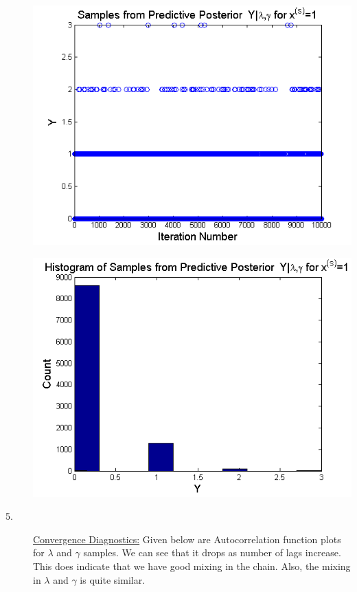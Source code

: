 \documentclass{article}
\begin{document}
\begin{description}
\noindent
\begin{left}
\includegraphics[scale=0.5]{PredPostXs1.png}
\end{left}
\begin{right}
\includegraphics[scale=0.5]{HistPredPostXs1.png}\\
\end{right}

\item[5.] \underline{Convergence Diagnostics:}
\noindent Given below are Autocorrelation function plots for $\lambda$ and $\gamma$ samples. We can see that it drops as number of lags increase. This does indicate that we have good mixing in the chain. Also, the mixing in $\lambda$ and $\gamma$ is quite similar.\\


\end{description}
\end{document}

